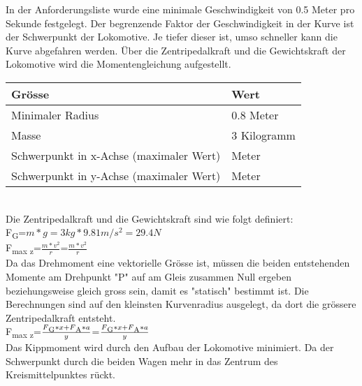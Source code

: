\documentclass[../../main.tex]{subfiles}
\begin{document}
\begin{table}[H]
\begin{table}[H]
\begin{table}[H]
\begin{table}[H]
    In der Anforderungsliste wurde eine minimale Geschwindigkeit von 0.5 Meter pro Sekunde festgelegt. Der begrenzende Faktor der Geschwindigkeit in der Kurve ist der Schwerpunkt der Lokomotive. Je tiefer dieser ist, umso schneller kann die Kurve abgefahren werden. Über die Zentripedalkraft und die Gewichtskraft der Lokomotive wird die Momentengleichung aufgestellt. 

    \begin{table}[H] \centering
        \begin{tabular}{|l|l|}
        \hline
        \textbf{Grösse} & \textbf{Wert}\\
        \hline
        Minimaler Radius                                 & 0.8 Meter\\
         \hline
        Masse                                            & 3 Kilogramm\\
        \hline
        Schwerpunkt in x-Achse (maximaler Wert)          & Meter\\
        \hline
        Schwerpunkt in y-Achse (maximaler Wert)          & Meter\\
        \hline
        \end{tabular}\\
   
        Die Zentripedalkraft und die Gewichtskraft sind wie folgt definiert:\\
    
    F\textsubscript{G}=\(m*g=3kg*9.81m/s^2=29.4N\)\\

    F\textsubscript{max z}=\(\frac{m*v^2}{r}\)=\(\frac{m*v^2}{r}\)\\
    
    Da das Drehmoment eine vektorielle Grösse ist, müssen die beiden entstehenden Momente am Drehpunkt "P" auf am Gleis zusammen Null ergeben beziehungsweise gleich gross sein, damit es "statisch" bestimmt ist. Die Berechnungen sind auf den kleinsten Kurvenradius ausgelegt, da dort die grössere Zentripedalkraft entsteht.\\

    F\textsubscript{max z}=\(\frac{F\textsubscript{G}*x+F\textsubscript{A}*a}{y}\)=\(\frac{F\textsubscript{G}*x+F\textsubscript{A}*a}{y}\)\\

    
    Das Kippmoment wird durch den Aufbau der Lokomotive minimiert. Da der Schwerpunkt durch die beiden Wagen mehr in das Zentrum des Kreismittelpunktes rückt.
    

\end{table}
\end{table}
\end{table}
\end{table}
\end{table}
\end{document}
